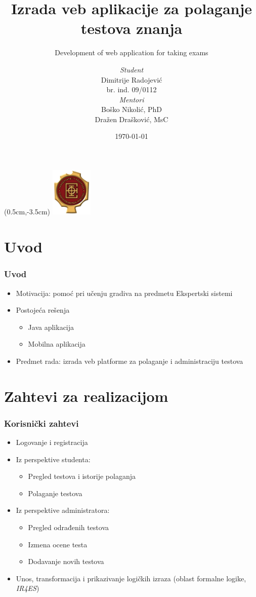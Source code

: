 \documentclass[compress,12pt,hyperref=unicode]{beamer}
\author{
\texorpdfstring{
\textit{Student}\\Dimitrije Radojević \\ br. ind. 09/0112 \\ \vspace{0.5cm}
\textit{Mentori}\\
Boško Nikolić, PhD\\
Dražen Drašković, MsC}{Dimitrije Radojevic}}
\title{Izrada veb aplikacije za polaganje testova znanja}
\subtitle{\small{Development of web application for taking exams}}
\institute{Elektrotehnički fakultet \\ Univerzitet u Beogradu}
\date{\today}
\begin{document}
\begin{frame}[plain]
\titlepage
\begin{textblock*}{2cm}(0.5cm,-3.5cm)
\includegraphics[width=2cm]{etf}
\end{textblock*}
\end{frame}

\section{Uvod}
\begin{frame}
\frametitle{Uvod}
\begin{itemize}
\item Motivacija: pomoć pri učenju gradiva na predmetu Ekspertski sistemi
\item Postojeća rešenja
\begin{itemize}
\item Java aplikacija
\item Mobilna aplikacija
\end{itemize}
\item Predmet rada: izrada veb platforme za polaganje i administraciju testova
\end{itemize}
\end{frame}

\section{Zahtevi za realizacijom}
\begin{frame}
\frametitle{Korisnički zahtevi}
\begin{itemize}
\item Logovanje i registracija
\item Iz perspektive studenta:
\begin{itemize}
\item Pregled testova i istorije polaganja
\item Polaganje testova
\end{itemize}
\item Iz perspektive administratora:
\begin{itemize}
\item Pregled odrađenih testova
\item Izmena ocene testa
\item Dodavanje novih testova
\end{itemize}
\item Unos, transformacija i prikazivanje logičkih izraza (oblast formalne logike, \textit{IR4ES})
\end{itemize}
\end{frame}
\end{document}
